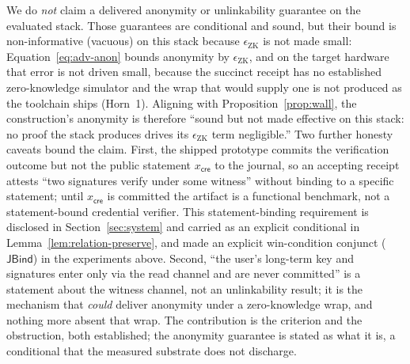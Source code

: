 We do \emph{not} claim a delivered anonymity or unlinkability guarantee on the evaluated stack. Those
guarantees are conditional and sound, but their bound is non-informative (vacuous) on this stack because
$\epsilon_{\mathrm{ZK}}$ is not made small: Equation~\eqref{eq:adv-anon} bounds anonymity by
$\epsilon_{\mathrm{ZK}}$, and on the target hardware that error is not driven small, because the
succinct receipt has no established zero-knowledge simulator and the wrap that would supply one is not
produced as the toolchain ships (Horn~1). Aligning with Proposition~\ref{prop:wall}, the construction's
anonymity is therefore ``sound but not made effective on this stack: no proof the stack produces drives
its $\epsilon_{\mathrm{ZK}}$ term negligible.'' Two further honesty caveats bound the claim. First, the
shipped prototype commits the verification outcome but not the public statement $x_{\mathsf{cre}}$ to the
journal, so an accepting receipt attests ``two signatures verify under some witness'' without binding to
a specific statement; until $x_{\mathsf{cre}}$ is committed the artifact is a functional benchmark, not a
statement-bound credential verifier. This statement-binding requirement is disclosed in
Section~\ref{sec:system} and carried as an explicit conditional in Lemma~\ref{lem:relation-preserve}, and
made an explicit win-condition conjunct ($\mathsf{JBind}$) in the experiments above. Second, ``the user's
long-term key and signatures enter only via the read channel and are never committed'' is a statement
about the witness channel, not an unlinkability result; it is the mechanism that \emph{could} deliver
anonymity under a zero-knowledge wrap, and nothing more absent that wrap. The contribution is the
criterion and the obstruction, both established; the anonymity guarantee is stated as what it is, a
conditional that the measured substrate does not discharge.
